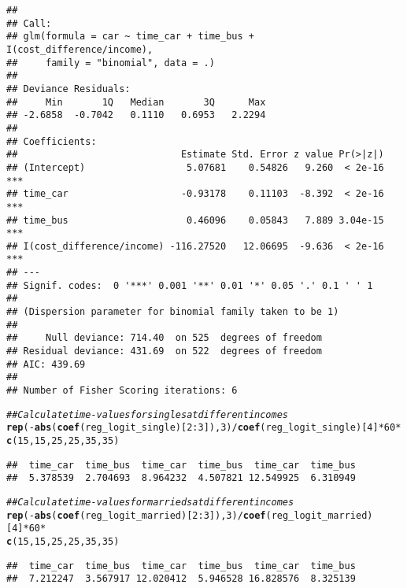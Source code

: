 \documentclass[11pt,letterpaper]{article}\usepackage[]{graphicx}\usepackage[]{color}
\makeatletter
\newcommand{\hlnum}[1]{\textcolor[rgb]{0.686,0.059,0.569}{#1}}%
\newcommand{\hlcom}[1]{\textcolor[rgb]{0.678,0.584,0.686}{\textit{#1}}}%
\newcommand{\hlopt}[1]{\textcolor[rgb]{0,0,0}{#1}}%
\newcommand{\hlstd}[1]{\textcolor[rgb]{0.345,0.345,0.345}{#1}}%
\newcommand{\hlkwd}[1]{\textcolor[rgb]{0.737,0.353,0.396}{\textbf{#1}}}%
\newenvironment{kframe}{%
 \def\at@end@of@kframe{}%
 \ifinner\ifhmode%
  \def\at@end@of@kframe{\end{minipage}}%
  \begin{minipage}{\columnwidth}%
 \fi\fi%
 \def\FrameCommand##1{\hskip\@totalleftmargin \hskip-\fboxsep
 \colorbox{shadecolor}{##1}\hskip-\fboxsep
     \hskip-\linewidth \hskip-\@totalleftmargin \hskip\columnwidth}%
 \MakeFramed {\advance\hsize-\width
   \@totalleftmargin\z@ \linewidth\hsize
   \@setminipage}}%
 {\par\unskip\endMakeFramed%
 \at@end@of@kframe}
\newenvironment{knitrout}{}{} %
\makeatother
\begin{document}
\begin{enumerate}[label=\alph*., leftmargin=*]
\begin{knitrout}
\begin{kframe}
\begin{verbatim}
## 
## Call:
## glm(formula = car ~ time_car + time_bus + I(cost_difference/income), 
##     family = "binomial", data = .)
## 
## Deviance Residuals: 
##     Min       1Q   Median       3Q      Max  
## -2.6858  -0.7042   0.1110   0.6953   2.2294  
## 
## Coefficients:
##                             Estimate Std. Error z value Pr(>|z|)    
## (Intercept)                  5.07681    0.54826   9.260  < 2e-16 ***
## time_car                    -0.93178    0.11103  -8.392  < 2e-16 ***
## time_bus                     0.46096    0.05843   7.889 3.04e-15 ***
## I(cost_difference/income) -116.27520   12.06695  -9.636  < 2e-16 ***
## ---
## Signif. codes:  0 '***' 0.001 '**' 0.01 '*' 0.05 '.' 0.1 ' ' 1
## 
## (Dispersion parameter for binomial family taken to be 1)
## 
##     Null deviance: 714.40  on 525  degrees of freedom
## Residual deviance: 431.69  on 522  degrees of freedom
## AIC: 439.69
## 
## Number of Fisher Scoring iterations: 6
\end{verbatim}
\begin{alltt}
\hlcom{## Calculate time-values for singles at different incomes}
\hlkwd{rep}\hlstd{(}\hlopt{-}\hlkwd{abs}\hlstd{(}\hlkwd{coef}\hlstd{(reg_logit_single)[}\hlnum{2}\hlopt{:}\hlnum{3}\hlstd{]),} \hlnum{3}\hlstd{)} \hlopt{/} \hlkwd{coef}\hlstd{(reg_logit_single)[}\hlnum{4}\hlstd{]} \hlopt{*} \hlnum{60} \hlopt{*}
  \hlkwd{c}\hlstd{(}\hlnum{15}\hlstd{,} \hlnum{15}\hlstd{,} \hlnum{25}\hlstd{,} \hlnum{25}\hlstd{,} \hlnum{35}\hlstd{,} \hlnum{35}\hlstd{)}
\end{alltt}
\begin{verbatim}
##  time_car  time_bus  time_car  time_bus  time_car  time_bus 
##  5.378539  2.704693  8.964232  4.507821 12.549925  6.310949
\end{verbatim}
\begin{alltt}
\hlcom{## Calculate time-values for marrieds at different incomes}
\hlkwd{rep}\hlstd{(}\hlopt{-}\hlkwd{abs}\hlstd{(}\hlkwd{coef}\hlstd{(reg_logit_married)[}\hlnum{2}\hlopt{:}\hlnum{3}\hlstd{]),} \hlnum{3}\hlstd{)} \hlopt{/} \hlkwd{coef}\hlstd{(reg_logit_married)[}\hlnum{4}\hlstd{]} \hlopt{*} \hlnum{60} \hlopt{*}
  \hlkwd{c}\hlstd{(}\hlnum{15}\hlstd{,} \hlnum{15}\hlstd{,} \hlnum{25}\hlstd{,} \hlnum{25}\hlstd{,} \hlnum{35}\hlstd{,} \hlnum{35}\hlstd{)}
\end{alltt}
\begin{verbatim}
##  time_car  time_bus  time_car  time_bus  time_car  time_bus 
##  7.212247  3.567917 12.020412  5.946528 16.828576  8.325139
\end{verbatim}
\end{kframe}
\end{knitrout}


\end{enumerate}
\end{document}
